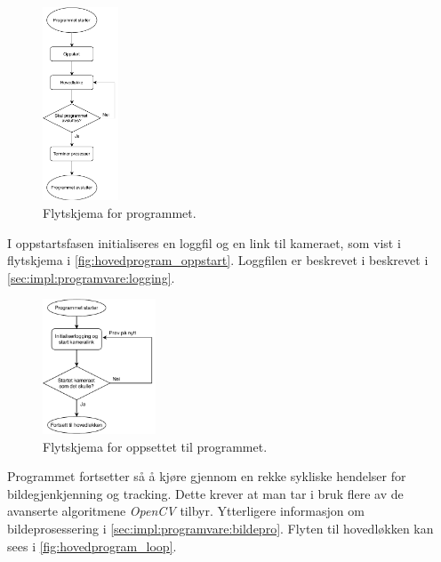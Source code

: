 \begin{figure}[H]
    \centering
    \includegraphics[width=0.2\textwidth]{implementering/Program/hovedprogram.pdf}
    \caption{Flytskjema for programmet.}
    \label{fig:hovedprogram}
\end{figure}
I oppstartsfasen initialiseres en loggfil og en link til kameraet, som vist i flytskjema i \autoref{fig:hovedprogram_oppstart}. Loggfilen er beskrevet i beskrevet i \autoref{sec:impl:programvare:logging}.

\begin{figure}[H]
    \centering
    \includegraphics[width=0.3\textwidth]{implementering/Program/oppstart.pdf}
    \caption{Flytskjema for oppsettet til programmet.}
    \label{fig:hovedprogram_oppstart}
\end{figure}

Programmet fortsetter så å kjøre gjennom en rekke sykliske hendelser for bildegjenkjenning og tracking. 
Dette krever at man tar i bruk flere av de avanserte algoritmene \textit{OpenCV} tilbyr.
Ytterligere informasjon om bildeprosessering i \autoref{sec:impl:programvare:bildepro}. 
Flyten til hovedløkken kan sees i \autoref{fig:hovedprogram_loop}.

